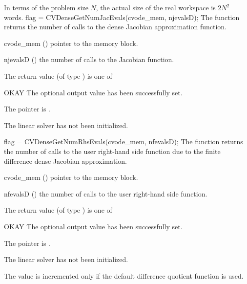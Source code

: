 {
  In terms of the problem size $N$, the actual size of the real workspace
  is $2N^2$  words.
}
{
  flag = CVDenseGetNumJacEvals(cvode\_mem, njevalsD);
}
{
  The function  returns the
  number of calls to the dense Jacobian approximation function.
}
{
  \begin{args}
  \item[cvode\_mem] ()
    pointer to the {\cvode} memory block.
  \item[njevalsD] ()
    the number of calls to the Jacobian function.
  \end{args}
}
{
  The return value  (of type ) is one of
  \begin{args}
  \item[OKAY] 
    The optional output value has been successfully set.
  \item[\Id{LIN\_NO\_MEM}]
    The  pointer is .
  \item[\Id{LIN\_NO\_LMEM}]
    The {\cvdense} linear solver has not been initialized.
  \end{args}
}
{}
{
  flag = CVDenseGetNumRhsEvals(cvode\_mem, nfevalsD);
}
{
  The function  returns the
  number of calls to the user right-hand side function due to the 
  finite difference dense Jacobian approximation.
}
{
  \begin{args}
  \item[cvode\_mem] ()
    pointer to the {\cvode} memory block.
  \item[nfevalsD] ()
    the number of calls to the user right-hand side function.
  \end{args}
}
{
  The return value  (of type ) is one of
  \begin{args}
  \item[OKAY] 
    The optional output value has been successfully set.
  \item[\Id{LIN\_NO\_MEM}]
    The  pointer is .
  \item[\Id{LIN\_NO\_LMEM}]
    The {\cvdense} linear solver has not been initialized.
  \end{args}
}
{
  The value  is incremented only if the default 
   difference quotient function is used.
}
